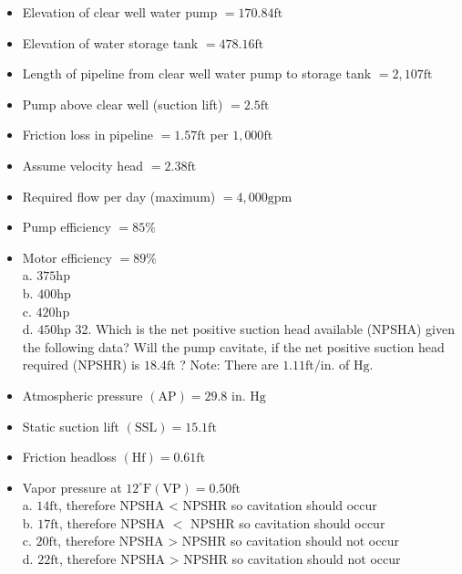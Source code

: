 \documentclass[10pt]{article}
\begin{document}
\begin{itemize}
  \item Elevation of clear well water pump $=170.84 \mathrm{ft}$

  \item Elevation of water storage tank $=478.16 \mathrm{ft}$

  \item Length of pipeline from clear well water pump to storage tank $=2,107 \mathrm{ft}$

  \item Pump above clear well (suction lift) $=2.5 \mathrm{ft}$

  \item Friction loss in pipeline $=1.57 \mathrm{ft}$ per $1,000 \mathrm{ft}$

  \item Assume velocity head $=2.38 \mathrm{ft}$

  \item Required flow per day (maximum) $=4,000 \mathrm{gpm}$

  \item Pump efficiency $=85 \%$

  \item Motor efficiency $=89 \%$\\
a. $375 \mathrm{hp}$\\
b. $400 \mathrm{hp}$\\
c. $420 \mathrm{hp}$\\
d. $450 \mathrm{hp}$ 32. Which is the net positive suction head available (NPSHA) given the following data? Will the pump cavitate, if the net positive suction head required (NPSHR) is $18.4 \mathrm{ft}$ ? Note: There are $1.11 \mathrm{ft} / \mathrm{in}$. of $\mathrm{Hg}$.

  \item Atmospheric pressure $(\mathrm{AP})=29.8$ in. $\mathrm{Hg}$

  \item Static suction lift $(\mathrm{SSL})=15.1 \mathrm{ft}$

  \item Friction headloss $(\mathrm{Hf})=0.61 \mathrm{ft}$

  \item Vapor pressure at $12^{\circ} \mathrm{F}(\mathrm{VP})=0.50 \mathrm{ft}$\\
a. $14 \mathrm{ft}$, therefore NPSHA < NPSHR so cavitation should occur\\
b. $17 \mathrm{ft}$, therefore NPSHA $<$ NPSHR so cavitation should occur\\
c. $20 \mathrm{ft}$, therefore NPSHA > NPSHR so cavitation should not occur\\
d. $22 \mathrm{ft}$, therefore NPSHA > NPSHR so cavitation should not occur

\end{itemize}
\end{document}
